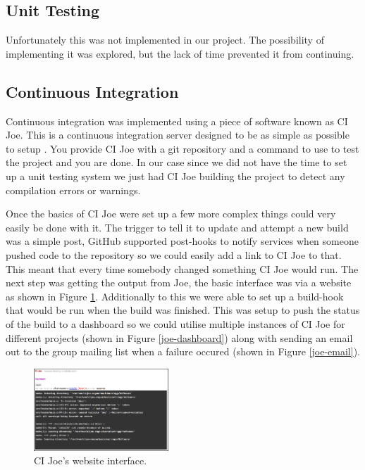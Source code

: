   \subsection{Unit Testing}

    Unfortunately this was not implemented in our project.  The possibility of
    implementing it was explored, but the lack of time prevented it from
    continuing.

  \subsection{Continuous Integration}

    Continuous integration was implemented using a piece of software known as CI
    Joe.  This is a continuous integration server designed to be as simple as
    possible to setup \cite{ci-joe}.  You provide CI Joe with a git repository and a command
    to use to test the project and you are done.  In our case since we did not
    have the time to set up a unit testing system we just had CI Joe building
    the project to detect any compilation errors or warnings.

    Once the basics of CI Joe were set up a few more complex things could very
    easily be done with it.  The trigger to tell it to update and attempt a new
    build was a simple post, GitHub supported post-hooks to notify services when
    someone pushed code to the repository so we could easily add a link to CI
    Joe to that.  This meant that every time somebody changed something CI Joe
    would run.  The next step was getting the output from Joe, the basic
    interface was via a website as shown in Figure \ref{joe-website}.
    Additionally to this we were able to set up a build-hook that would be run
    when the build was finished.  This was setup to push the status of the build
    to a dashboard so we could utilise multiple instances of CI Joe for
    different projects (shown in Figure \ref{joe-dashboard}) along with sending
    an email out to the group mailing list when a failure occured (shown in
    Figure \ref{joe-email}).

    \begin{figure}
    \centering
    \includegraphics[width=0.45\textwidth]{images/joe-website}
    \caption{CI Joe's website interface.}
    \label{joe-website}
    \end{figure}

